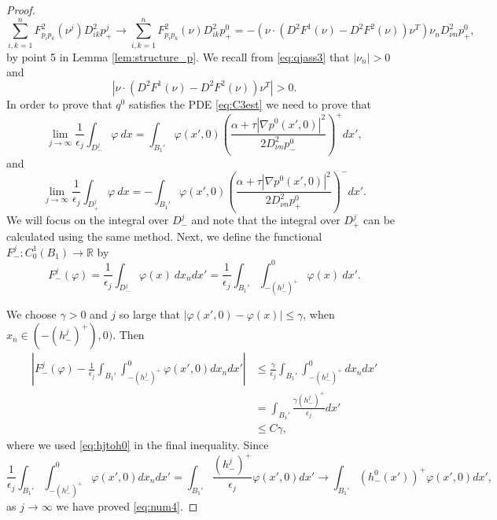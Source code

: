 \documentclass[10pt,a4paper]{amsart}
\begin{document}
\begin{proof}
$$         \sum_{i, k = 1}^n F^2_{p_i p_k}(\nu^j)D^2_{ik} p_+^j  \to  \sum_{i, k = 1}^n F^2_{p_i p_k}(\nu)D^2_{ik} p_+^0  = -(\nu \cdot (D^2 F^1 (\nu)-D^2 F^2(\nu)) \nu^T) \nu_n D^2_{\nu n}p^0_+,
$$
by point 5 in Lemma \ref{lem:structure_p}. We recall from \eqref{eq:qjass3} that $|\nu_n| > 0$ and
\begin{equation*}
     \left| \nu \cdot (D^2 F^1(\nu)- D^2 F^2( \nu)) \nu^T \right| > 0.
\end{equation*}
In order to prove that $q^0$ satisfies the PDE \eqref{eq:C3est} we need to prove that
\begin{equation}\label{eq:num4}
    \lim_{j\to \infty} \frac{1}{\epsilon_j} \int_{D^j_-}  \varphi \ dx  =  \int_{B_1'}  \varphi(x',0) \left(\frac{\alpha+ \tau|\nabla p^0(x',0)|^2}{2 D^2_{\nu n} p^0_-}\right)^+  dx', 
\end{equation}
and
\begin{equation}\label{eq:num5}
  \lim_{j\to \infty} \frac{1}{\epsilon_j}  \int_{D^j_+}  \varphi \ dx =-  \int_{B_1'}  \varphi(x',0) \left(\frac{\alpha+ \tau|\nabla p^0(x',0)|^2}{2 D^2_{\nu n} p^0_+}\right)^-  dx'.  
\end{equation}
We will focus on the integral over $D^j_-$ and note that the integral over $D^j_+$ can be calculated using the same method. Next, we define the functional $F^j_-: C^1_0(B_1)\to \mathbb{R}$ by
$$
F^j_-(\varphi)=\frac{1}{\epsilon_j}\int_{D^j_-}  \varphi(x) \ dx_n dx' = \frac{1}{\epsilon_j}\int_{B_1'} \int_{-(h^j_-)^+}^0  \varphi(x) \ dx'.
$$

We choose $\gamma>0$ and $j$ so large that $|\varphi(x',0)-\varphi(x)| \leq \gamma$, when $x_n \in (-(h^j_-)^+),0)$. Then
\begin{align*}
\left|F^j_-(\varphi)-\frac{1}{\epsilon_j} \int_{B_1'} \int_{-(h^j_-)^+}^0 \varphi(x',0) dx_n dx' \right| &\leq \frac{\gamma}{\epsilon_j} \int_{B_1'} \int_{-(h^j_-)^+}^0 dx_n dx' \\
&= \int_{B_1'} \frac{\gamma(h^j_-)^+}{\epsilon_j} dx'\\
&\leq C \gamma,
\end{align*}
where we used \eqref{eq:hjtoh0} in the final inequality. Since
$$
\frac{1}{\epsilon_j} \int_{B_1'} \int_{-(h^j_-)^+}^0 \varphi(x',0) dx_n dx' = \int_{B_1'} \frac{(h^j_-)^+}{\epsilon_j}  \varphi(x',0) dx' \to \int_{B_1'}  (h^0_-(x'))^+ \varphi(x',0) dx',
$$
as $j \to \infty$ we have proved \eqref{eq:num4}.


\end{proof}
\end{document}
